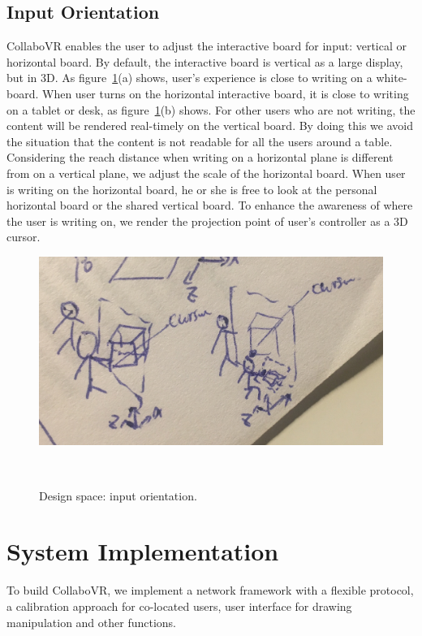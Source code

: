 \documentclass{sigchi}
\begin{document}
\subsection{Input Orientation}
CollaboVR enables the user to adjust the interactive board for input: vertical or horizontal board. By default, the interactive board is vertical as a large display, but in 3D. As figure~\ref{fig:inputorientation}(a) shows, user's experience is close to writing on a white-board. When user turns on the horizontal interactive board, it is close to writing on a tablet or desk, as figure~\ref{fig:inputorientation}(b) shows. For other users who are not writing, the content will be rendered real-timely on the vertical board. By doing this we avoid the situation that the content is not readable for all the users around a table. Considering the reach distance when writing on a horizontal plane is different from on a vertical plane, we adjust the scale of the horizontal board. When user is writing on the horizontal board, he or she is free to look at the personal horizontal board or the shared vertical board. To enhance the awareness of where the user is writing on, we render the projection point of user's controller as a 3D cursor.

\begin{figure}[b!]
 \centering
 \includegraphics[width=0.9\columnwidth]{inputorientation.jpg}
 \caption{Design space: input orientation.
 }~\label{fig:inputorientation}
\end{figure}

\section{System Implementation}
To build CollaboVR, we implement a network framework with a flexible protocol, a calibration approach for co-located users, user interface for drawing manipulation and other functions.
\end{document}
